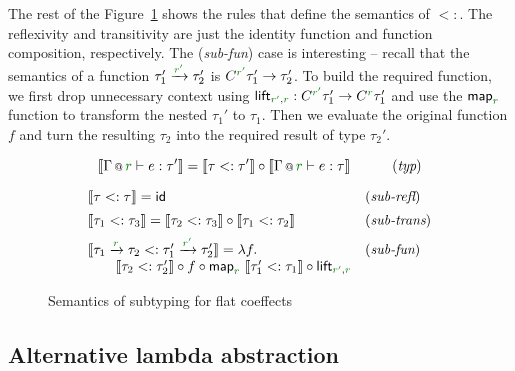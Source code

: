 The rest of the Figure~\ref{fig:flat-semantics-sub} shows the rules that define the semantics
of $<:$. The reflexivity and transitivity are just the identity function and function composition,
respectively. The (\emph{sub-fun}) case is interesting -- recall that the semantics of a function
$\tau_1' \xrightarrow{\cclrd{r'}} \tau_2'$ is $C^{\cclrd{r'}} \tau_1' \rightarrow \tau_2'$. To 
build the required function, we first drop unnecessary context using $\ident{lift}_{\cclrd{r'}, \cclrd{r}}
 : C^{\cclrd{r'}} \tau_1' \rightarrow C^{\cclrd{r}} \tau_1'$ and use the $\ident{map}_{\cclrd{r}}$
function to transform the nested $\tau_1'$ to $\tau_1$. Then we evaluate the original function $f$
and turn the resulting $\tau_2$ into the required result of type $\tau_2'$.


\begin{figure}[t]

\begin{equation*}
\sem{\coctx{\Gamma}{\cclrd{r}} \vdash e : \tau' } = 
  \sem{\tau <: \tau'} \circ \sem{\coctx{\Gamma}{\cclrd{r}} \vdash e : \tau } \qquad\quad (\emph{typ})
\end{equation*}

\begin{equation*}
\begin{array}{ll}
\sem{\tau <: \tau} = \ident{id} & (\emph{sub-refl})
\\[0.5em]
\sem{\tau_1 <: \tau_3} = \sem{\tau_2 <: \tau_3} \circ \sem{\tau_1 <: \tau_2} & (\emph{sub-trans})
\\[0.5em]
\sem{\tau_1 \xrightarrow{\cclrd{r}} \tau_2 <: \tau_1' \xrightarrow{\cclrd{r'}} \tau_2'} = \lambda f. & (\emph{sub-fun}) \\
\qquad\sem{\tau_2 <: \tau_2'} \circ f \circ \ident{map}_{\cclrd{r}}~\sem{\tau_1' <: \tau_1} 
  \circ \ident{lift}_{\cclrd{r'}, \cclrd{r}}
\end{array}
\end{equation*}

\caption{Semantics of subtyping for flat coeffects}
\label{fig:flat-semantics-sub}
\end{figure}


\subsection{Alternative lambda abstraction}
\label{sec:flat-exts-lambda}

